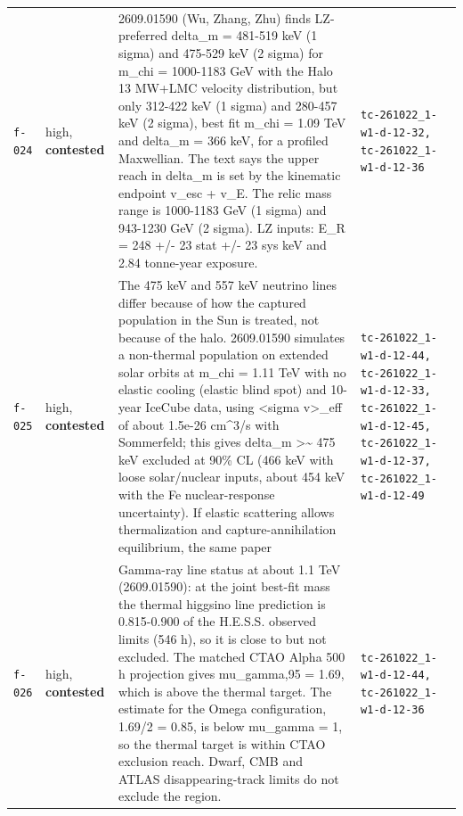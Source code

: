 \documentclass[11pt,a4paper]{article}
\begin{document}
\begin{longtable}{@{}p{}p{}p{}p{}@{}}
\texttt{f-024} & high, \textbf{contested} & 2609.01590 (Wu, Zhang, Zhu) finds LZ-preferred delta\_m = 481-519 keV (1 sigma) and 475-529 keV (2 sigma) for m\_chi = 1000-1183 GeV with the Halo 13 MW+LMC velocity distribution, but only 312-422 keV (1 sigma) and 280-457 keV (2 sigma), best fit m\_chi = 1.09 TeV and delta\_m = 366 keV, for a profiled Maxwellian. The text says the upper reach in delta\_m is set by the kinematic endpoint v\_esc + v\_E. The relic mass range is 1000-1183 GeV (1 sigma) and 943-1230 GeV (2 sigma). LZ inputs: E\_R = 248 +/- 23 stat +/- 23 sys keV and 2.84 tonne-year exposure. & \texttt{tc-261022\_\allowbreak{}1-w1-d-12-32,\allowbreak{} tc-261022\_\allowbreak{}1-w1-d-12-36} \\
\texttt{f-025} & high, \textbf{contested} & The 475 keV and 557 keV neutrino lines differ because of how the captured population in the Sun is treated, not because of the halo. 2609.01590 simulates a non-thermal population on extended solar orbits at m\_chi = 1.11 TeV with no elastic cooling (elastic blind spot) and 10-year IceCube data, using \textless{}sigma v\textgreater{}\_eff of about 1.5e-26 cm\textasciicircum{}3/s with Sommerfeld; this gives delta\_m \textgreater{}\textasciitilde{} 475 keV excluded at 90\% CL (466 keV with loose solar/nuclear inputs, about 454 keV with the Fe nuclear-response uncertainty). If elastic scattering allows thermalization and capture-annihilation equilibrium, the same paper & \texttt{tc-261022\_\allowbreak{}1-w1-d-12-44,\allowbreak{} tc-261022\_\allowbreak{}1-w1-d-12-33,\allowbreak{} tc-261022\_\allowbreak{}1-w1-d-12-45,\allowbreak{} tc-261022\_\allowbreak{}1-w1-d-12-37,\allowbreak{} tc-261022\_\allowbreak{}1-w1-d-12-49} \\
\texttt{f-026} & high, \textbf{contested} & Gamma-ray line status at about 1.1 TeV (2609.01590): at the joint best-fit mass the thermal higgsino line prediction is 0.815-0.900 of the H.E.S.S. observed limits (546 h), so it is close to but not excluded. The matched CTAO Alpha 500 h projection gives mu\_gamma,95 = 1.69, which is above the thermal target. The estimate for the Omega configuration, 1.69/2 = 0.85, is below mu\_gamma = 1, so the thermal target is within CTAO exclusion reach. Dwarf, CMB and ATLAS disappearing-track limits do not exclude the region. & \texttt{tc-261022\_\allowbreak{}1-w1-d-12-44,\allowbreak{} tc-261022\_\allowbreak{}1-w1-d-12-36} \\

\end{longtable}
\end{document}

